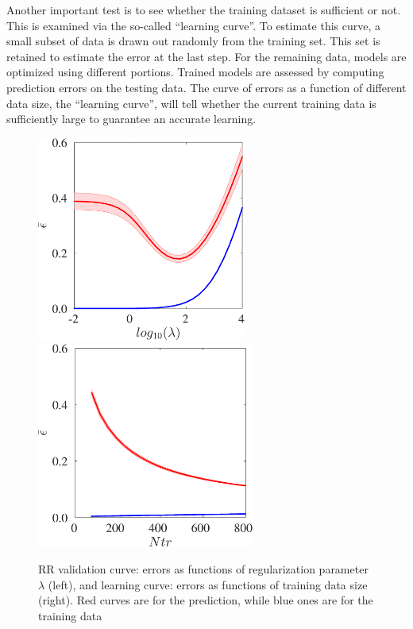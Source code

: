 Another important test is to see whether the training dataset is sufficient or not. This is examined via the so-called ``learning curve''. To estimate this curve, a small subset of data is drawn out randomly from the training set. This set is retained to estimate the error at the last step. For the remaining data, models are optimized using different portions. Trained models are assessed by computing prediction errors on the testing data. The curve of errors as a function of different data size, the ``learning curve'', will tell whether the current training data is sufficiently large to guarantee an accurate learning.

\begin{figure}
\centering
	\includegraphics[height=6.75cm]{./images/regression/RR_validationcurve.eps}
	\hspace{0.3cm}
	\includegraphics[height=6.75cm]{./images/regression/RR_learningcurve.eps}	
	\caption{\label{fig:RR_validationcurve} RR validation curve: errors as functions of regularization parameter $ \lambda $ (left), and learning curve: errors as functions of training data size (right). Red curves are for the prediction, while blue ones are for the training data}
\end{figure}
